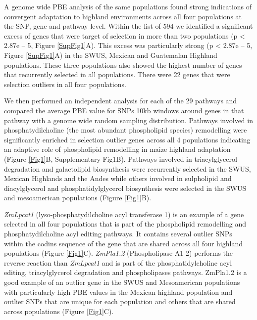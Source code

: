 \documentclass[9pt,twocolumn,twoside,lineno]{gsajnl}
\begin{document}
A genome wide PBE analysis of the same populations \cite{Wang2017-bc} found strong indications of convergent adaptation to highland environments across all four populations at the SNP, gene and pathway level.
Within the list of 594 we identified a significant excess of genes that were target of selection in more than two populations (p < 2.87e – 5, Figure \ref{SupFig1}A). This excess was particularly strong (p < 2.87e – 5, Figure \ref{SupFig1}A) in the SWUS, Mexican and Guatemalan Highland populations. 
These three populations also showed the highest number of genes that recurrently selected in all populations. 
There were 22 genes that were selection outliers in all four populations. 

We then performed an independent analysis for each of the 29 pathways and compared the average PBE value for SNPs 10kb windows around genes in that pathway with a genome wide random sampling distribution. Pathways involved in phosphatydilcholine (the most abundant phospholipid species) remodelling were significantly enriched in selection outlier genes across all 4 populations indicating an adaptive role of phospholipid remodelling in maize highland adaptation (Figure \ref{Fig1}B, Supplementary Fig1B).
Pathways involved in triacylglycerol degradation and galactolipid biosynthesis were recurrently selected in the SWUS, Mexican Highlands and the Andes while others involved in sulpholipid and diacylglycerol and phosphatidylglycerol biosynthesis were selected in the SWUS and mesoamerican populations (Figure \ref{Fig1}B).  

\textit{ZmLpcat1} (lyso-phosphatydilcholine acyl transferase 1) is an example of a gene selected in all four populations that is part of the phospholipid remodelling and phosphatydilcholine acyl editing pathways. 
It contains several outlier SNPs within the codins sequence of the gene that are shared across all four highland populations (Figure \ref{Fig1}C). \textit{ZmPla1.2} (Phospholipase A1 2) performs the reverse reaction than \textit{ZmLpcat1} and is part of the phosphatidylcholine acyl editing, triacylglycerol degradation and phospholipases pathways. 
ZmPla1.2 is a good example of an outlier gene in the SWUS and Mesoamerican populations with particularly high PBE values in the Mexican highland population and outlier SNPs that are unique for each population and others that are shared across populations (Figure \ref{Fig1}C).
\end{document}
